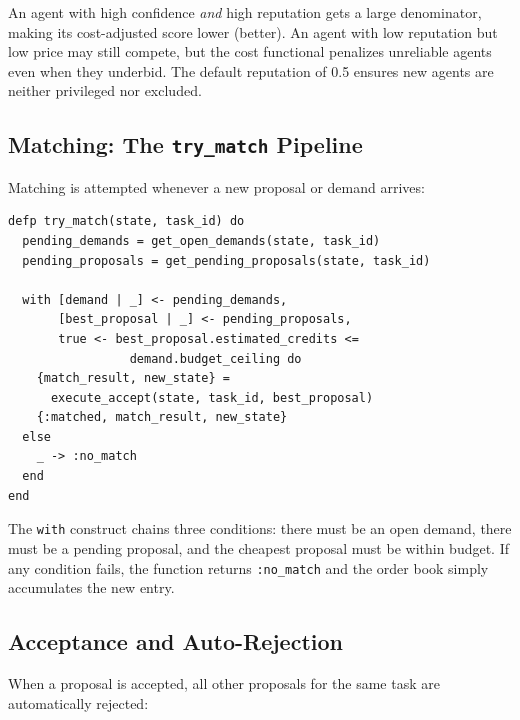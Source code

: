 \documentclass[12pt,a4paper]{article}
\theoremstyle{plain}
\theoremstyle{definition}
\begin{document}
An agent with high confidence \emph{and} high reputation gets a large denominator, making its cost-adjusted score lower (better). An agent with low reputation but low price may still compete, but the cost functional penalizes unreliable agents even when they underbid. The default reputation of 0.5 ensures new agents are neither privileged nor excluded.

\subsection{Matching: The \texttt{try\_match} Pipeline}

Matching is attempted whenever a new proposal or demand arrives:

\begin{lstlisting}[caption={Matching algorithm},label={lst:ob-match}]
defp try_match(state, task_id) do
  pending_demands = get_open_demands(state, task_id)
  pending_proposals = get_pending_proposals(state, task_id)

  with [demand | _] <- pending_demands,
       [best_proposal | _] <- pending_proposals,
       true <- best_proposal.estimated_credits <=
                 demand.budget_ceiling do
    {match_result, new_state} =
      execute_accept(state, task_id, best_proposal)
    {:matched, match_result, new_state}
  else
    _ -> :no_match
  end
end
\end{lstlisting}

The \texttt{with} construct chains three conditions: there must be an open demand, there must be a pending proposal, and the cheapest proposal must be within budget. If any condition fails, the function returns \texttt{:no\_match} and the order book simply accumulates the new entry.

\subsection{Acceptance and Auto-Rejection}

When a proposal is accepted, all other proposals for the same task are automatically rejected:
\end{document}
